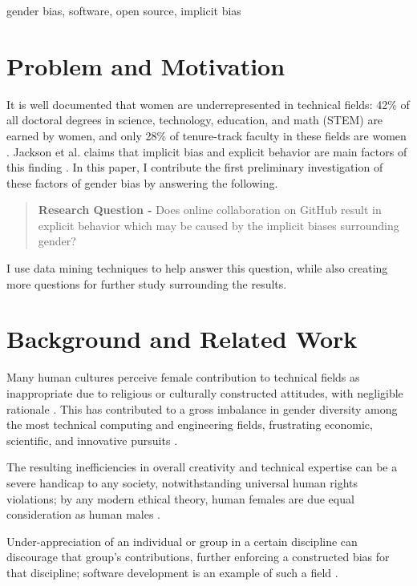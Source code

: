 \documentclass{sigplanconf}
\begin{document}

\keywords
gender bias, software, open source, implicit bias

\section{Problem and Motivation}

It is well documented that women are underrepresented in technical fields:
42\% of all doctoral degrees in science, technology, education, and
math (STEM) are earned by women, and only 28\% of tenure-track faculty in these
fields are women \cite{womenengineering}. Jackson et al. claims that implicit
bias and explicit behavior are main
factors of this finding \citep{implicitbias}. In this paper, I
contribute the first preliminary investigation of these factors of gender bias
by answering the following.

\begin{quote}
  \textbf{Research Question -} Does online collaboration on GitHub result in
  explicit behavior which may be caused by the implicit biases surrounding
  gender?
\end{quote}

I use data mining techniques to help answer this question, while also creating
more questions for further study surrounding the results.

\section{Background and Related Work}

Many human cultures perceive female contribution to technical
fields as inappropriate due to religious or culturally constructed attitudes, with
negligible rationale \citep{elamin2010saudiwomen}. This has contributed to a gross imbalance in gender diversity among
the most technical computing and engineering fields, frustrating economic,
scientific, and innovative pursuits \citep{genderscience}.

The resulting inefficiencies in overall creativity and technical expertise
can be a severe handicap to any society, notwithstanding universal human rights
violations; by any modern ethical theory, human females are due equal
consideration as human males \citep{ethicsgender}.

Under-appreciation of an individual or group in a certain
discipline can discourage that group's contributions, further enforcing a
constructed bias for that discipline; software development is an example of such
a field \citep{genderscience}.
\end{document}
